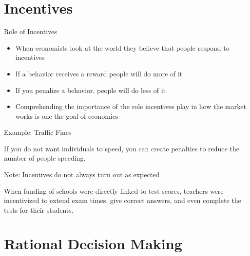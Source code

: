 \documentclass{beamer}
\begin{document}
\section{Incentives}

\begin{frame}{Role of Incentives}

\begin{itemize}
\item When economists look at the world they believe that people respond to incentives
\item If a behavior receives a reward people will do more of it
\item If you penalize a behavior, people will do less of it
\item  Comprehending the importance of the role
incentives play in how the market works is one
the goal of economics
\end{itemize}

\begin{exampleblock}{Example: Traffic Fines}

If you do not want individuals to speed, you can create penalties to reduce the number of people speeding.
\end{exampleblock}

\begin{alertblock}{Note: Incentives do not always turn out as expected}

When funding of schools were directly linked to test scores, teachers were incentivized to extend exam times, give correct answers, and even complete the tests for their students. 
\end{alertblock}
\end{frame}

\section{Rational Decision Making}
\end{document}
